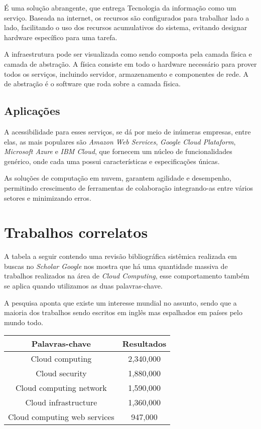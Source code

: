 \documentclass[12pt]{article}
\begin{document}
É uma solução abrangente, que entrega Tecnologia da informação como um serviço. Baseada na internet, os recursos são configurados para trabalhar lado a lado, facilitando o uso dos recursos acumulativos do sistema, evitando designar hardware específico para uma tarefa.

A infraestrutura pode ser visualizada como sendo composta pela camada física e camada de abstração. A física consiste em todo o hardware necessário para prover todos os serviços, incluindo servidor, armazenamento e componentes de rede. A de abstração é o software que roda sobre a camada física.

\subsection{Aplicações}

A acessibilidade para esses serviços, se dá por meio de inúmeras empresas, entre elas, as mais populares são \emph{Amazon Web Services}, \emph{Google Cloud Plataform}, \emph{Microsoft Azure} e \emph{IBM Cloud}, que fornecem um núcleo de funcionalidades genérico, onde cada uma possui características e especificações únicas.

As soluções de computação em nuvem, garantem agilidade e desempenho, permitindo crescimento de ferramentas de colaboração integrando-as entre vários setores e minimizando erros.

\section{Trabalhos correlatos}

A tabela a seguir contendo uma revisão bibliográfica sistêmica realizada em buscas no \emph{Scholar Google} nos mostra que há uma quantidade massiva de trabalhos realizados na área de \emph{Cloud Computing}, esse comportamento também se aplica quando utilizamos as duas palavras-chave.

A pesquisa aponta que existe um interesse mundial no assunto, sendo que a maioria dos trabalhos sendo escritos em inglês mas espalhados em países pelo mundo todo.

\begin{center}
    \begin{tabular}{ | c | c | }
    \hline
    Palavras-chave & Resultados \\ 
    \hline
    Cloud computing & 2,340,000 \\  
    \hline
    Cloud security & 1,880,000 \\
    \hline
    Cloud computing network & 1,590,000 \\
    \hline
    Cloud infrastructure & 1,360,000 \\
    \hline
    Cloud computing web services & 947,000 \\
    \hline
    \end{tabular}
\end{center}
\end{document}
